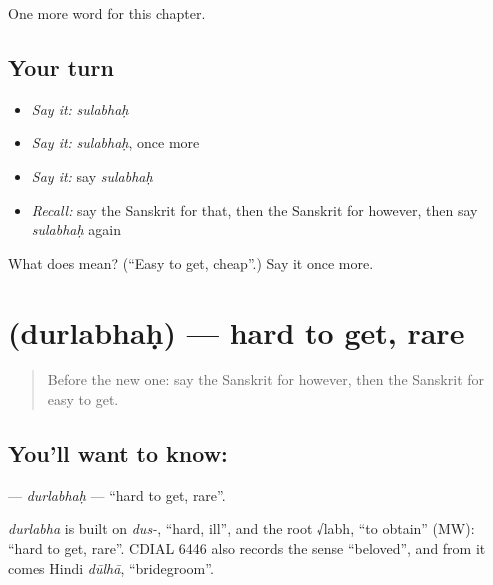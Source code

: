 \begin{grammarlens}[title={What you've built}]
One more word for this chapter.
\end{grammarlens}

\subsection*{Your turn}
\begin{itemize}
\raggedright
  \item \emph{Say it:} \emph{sulabhaḥ}
  \item \emph{Say it:} \emph{sulabhaḥ}, once more
  \item \emph{Say it:} say \emph{sulabhaḥ}
  \item \emph{Recall:} say the Sanskrit for that, then the Sanskrit for however, then say \emph{sulabhaḥ} again
\end{itemize}

\begin{tcolorbox}[breakable,colback=teal!4,colframe=teal!35!black,title={Before you move on}]
What does  mean? (\textquotedblleft{}Easy to get, cheap\textquotedblright{}.) Say it once more.
\end{tcolorbox}
\section[\texorpdfstring{\sk{दुर्लभः} (durlabhaḥ)}{दुर्लभः (durlabhaḥ)}]{ (durlabhaḥ) — hard to get, rare}

\label{lesson:SA-C242-durlabhah}



\begin{quote}
Before the new one: say the Sanskrit for however, then the Sanskrit for easy to get.
\end{quote}

\subsection*{You'll want to know: }
\textbf{} — \emph{durlabhaḥ} — \textquotedblleft{}hard to get, rare\textquotedblright{}.

\begin{cousinweb}
\emph{durlabha} is built on \emph{dus-}, \textquotedblleft{}hard, ill\textquotedblright{}, and the root √labh, \textquotedblleft{}to obtain\textquotedblright{} (MW): \textquotedblleft{}hard to get, rare\textquotedblright{}. CDIAL 6446 also records the sense \textquotedblleft{}beloved\textquotedblright{}, and from it comes Hindi \emph{dūlhā}, \textquotedblleft{}bridegroom\textquotedblright{}.
\end{cousinweb}


